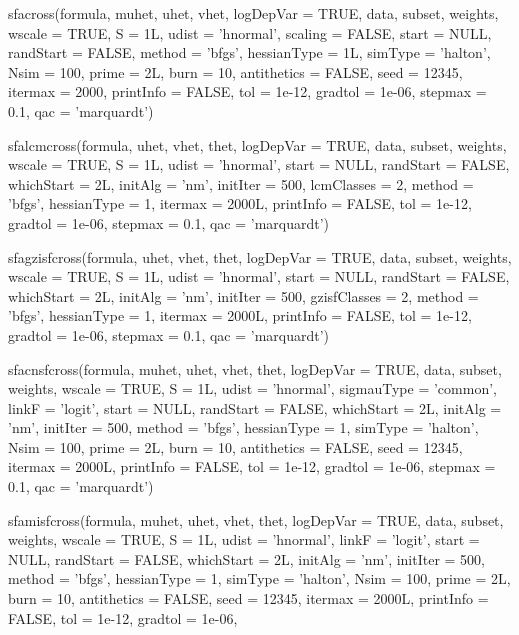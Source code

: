 \documentclass[nojss]{jss}
\begin{document}
\begin{Schunk}
\begin{Soutput}
sfacross(formula, muhet, uhet, vhet, logDepVar = TRUE, data, subset,
  weights, wscale = TRUE, S = 1L, udist = 'hnormal', scaling = FALSE, 
  start = NULL,   randStart = FALSE, method = 'bfgs', hessianType = 1L, 
  simType = 'halton', Nsim = 100, prime = 2L, burn = 10, antithetics = FALSE, 
  seed = 12345, itermax = 2000, printInfo = FALSE, tol = 1e-12, gradtol = 1e-06, 
  stepmax = 0.1, qac = 'marquardt')
\end{Soutput}
\begin{Soutput}
sfalcmcross(formula, uhet, vhet, thet, logDepVar = TRUE, data, subset,
 weights, wscale = TRUE, S = 1L, udist = 'hnormal', start = NULL, 
 randStart = FALSE, whichStart = 2L, initAlg = 'nm', initIter = 500, 
 lcmClasses = 2, method = 'bfgs', hessianType = 1, itermax = 2000L, 
 printInfo = FALSE, tol = 1e-12, gradtol = 1e-06, stepmax = 0.1, 
 qac = 'marquardt')
\end{Soutput}
\begin{Soutput}
sfagzisfcross(formula, uhet, vhet, thet, logDepVar = TRUE, data, subset,
  weights, wscale = TRUE, S = 1L, udist = 'hnormal', start = NULL, 
  randStart = FALSE, whichStart = 2L, initAlg = 'nm', initIter = 500, 
  gzisfClasses = 2, method = 'bfgs', hessianType = 1, itermax = 2000L, 
  printInfo = FALSE, tol = 1e-12, gradtol = 1e-06, stepmax = 0.1, 
  qac = 'marquardt')
\end{Soutput}
\begin{Soutput}
sfacnsfcross(formula, muhet, uhet, vhet, thet, logDepVar = TRUE, data,
  subset, weights, wscale = TRUE, S = 1L, udist = 'hnormal', 
  sigmauType = 'common', linkF = 'logit', start = NULL, randStart = FALSE, 
  whichStart = 2L, initAlg = 'nm', initIter = 500, method = 'bfgs', 
  hessianType = 1, simType = 'halton', Nsim = 100, prime = 2L, burn = 10, 
  antithetics = FALSE, seed = 12345, itermax = 2000L, printInfo = FALSE, 
  tol = 1e-12, gradtol = 1e-06, stepmax = 0.1, qac = 'marquardt')
\end{Soutput}
\begin{Soutput}
sfamisfcross(formula, muhet, uhet, vhet, thet, logDepVar = TRUE, data,
  subset, weights, wscale = TRUE, S = 1L, udist = 'hnormal', linkF = 'logit', 
  start = NULL,  randStart = FALSE, whichStart = 2L, initAlg = 'nm', 
  initIter = 500, method = 'bfgs', hessianType = 1, simType = 'halton', 
  Nsim = 100, prime = 2L, burn = 10, antithetics = FALSE, seed = 12345, 
  itermax = 2000L, printInfo = FALSE, tol = 1e-12, gradtol = 1e-06, 

\end{Soutput}
\end{Schunk}
\end{document}
